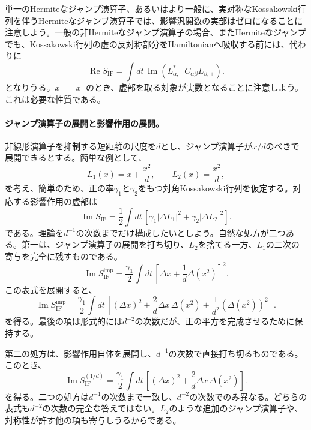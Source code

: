 \documentclass[a4paper,11pt,oneside]{article}
\theoremstyle{definition}
\numberwithin{equation}{section}
\begin{document}
単一のHermiteなジャンプ演算子、あるいはより一般に、実対称なKossakowski行列を伴うHermiteなジャンプ演算子では、影響汎関数の実部はゼロになることに注意しよう。一般の非Hermiteなジャンプ演算子の場合、またHermiteなジャンプでも、Kossakowski行列の虚の反対称部分をHamiltonianへ吸収する前には、代わりに
\begin{equation}
\operatorname{Re}S_{\mathrm{IF}}
=
\int dt\,
\operatorname{Im}
\left(
L_{\alpha,-}^{*}
C_{\alpha\beta}
L_{\beta,+}
\right).
\end{equation}
となりうる。$ x_{+}=x_{-}$のとき、虚部を取る対象が実数となることに注意しよう。これは必要な性質である。





\paragraph{ジャンプ演算子の展開と影響作用の展開。}
非線形演算子を抑制する短距離の尺度を$d$とし、ジャンプ演算子が$x/d$のべきで展開できるとする。簡単な例として、
\begin{equation}
L_{1}(x)
=
x+\frac{x^{2}}{d},
\qquad
L_{2}(x)
=
\frac{x^{2}}{d},
\end{equation}
を考え、簡単のため、正の率$\gamma_{1}$と$\gamma_{2}$をもつ対角Kossakowski行列を仮定する。対応する影響作用の虚部は
\begin{equation}
\operatorname{Im}S_{\mathrm{IF}}
=
\frac{1}{2}
\int dt\,
\left[
\gamma_{1}\left|\Delta L_{1}\right|^{2}
+
\gamma_{2}\left|\Delta L_{2}\right|^{2}
\right].
\end{equation}
である。理論を$d^{-1}$の次数までだけ構成したいとしよう。自然な処方が二つある。第一は、ジャンプ演算子の展開を打ち切り、$L_{2}$を捨てる一方、$L_{1}$の二次の寄与を完全に残すものである。
\begin{equation}
\operatorname{Im}S_{\mathrm{IF}}^{\mathrm{imp}}
=
\frac{\gamma_{1}}{2}
\int dt\,
\left[
\Delta x
+
\frac{1}{d}\Delta(x^{2})
\right]^{2}.
\end{equation}
この表式を展開すると、
\begin{equation}
\operatorname{Im}S_{\mathrm{IF}}^{\mathrm{imp}}
=
\frac{\gamma_{1}}{2}
\int dt\,
\left[
(\Delta x)^{2}
+
\frac{2}{d}
\Delta x\,\Delta(x^{2})
+
\frac{1}{d^{2}}
\left(\Delta(x^{2})\right)^{2}
\right].
\end{equation}
を得る。最後の項は形式的には$d^{-2}$の次数だが、正の平方を完成させるために保持する。



第二の処方は、影響作用自体を展開し、$d^{-1}$の次数で直接打ち切るものである。このとき、
\begin{equation}
\operatorname{Im}S_{\mathrm{IF}}^{(1/d)}
=
\frac{\gamma_{1}}{2}
\int dt\,
\left[
(\Delta x)^{2}
+
\frac{2}{d}
\Delta x\,\Delta(x^{2})
\right].
\end{equation}
を得る。二つの処方は$d^{-1}$の次数まで一致し、$d^{-2}$の次数でのみ異なる。どちらの表式も$ d^{-2}$の次数の完全な答えではない。$L_{2}$のような追加のジャンプ演算子や、対称性が許す他の項も寄与しうるからである。
\end{document}
